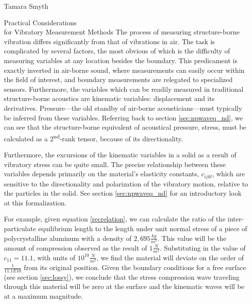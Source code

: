 \documentclass[a4paper,10pt]{report}
\numberwithin{equation}{section}
\begin{document}
\begin{chapter}{Tamara Smyth}
\begin{abstract}
 Imaging small vibrations have been of interest since Chladni first placed sand on a vibrating plate to make modal patterns visible. Discuss methods that have since been developed to remote sense and optically image sub-micrometer vibrations (e.g. laser Doppler vibrometry, holographic interferometry, electronic speckle pattern interferometry, etc.) including your own method currently being developed. Discuss the pros and cons of each method, and how your own method capitalizes on the strengths---or attempts to overcome any limitations---of its predecessors in the context of your particular application requirement(s).
\end{abstract}

\begin{section}{Practical Considerations\\ for Vibratory Measurement Methods}\label{sec:practical}
 The process of measuring structure-borne vibration differs significantly from that of vibrations in air. The task is complicated by several factors, the most obvious of which is the difficulty of measuring variables at any location besides the boundary. This predicament is exactly inverted in air-borne sound, where measurements can easily occur within the field of interest, and boundary measurements are relegated to specialized sensors. \cite[p.~3]{Cremer1973} Furthermore, the variables which can be readily measured in traditional structure-borne acoustics are kinematic variables: displacement and its derivatives. Pressure---the old standby of air-borne acousticians---must typically be inferred from these variables. Referring back to section \ref{sec:npwaveq_nd}, we can see that the structure-borne equivalent of acoustical pressure, stress, must be calculated as a 2\textsuperscript{nd}-rank tensor, because of its directionality. 

Furthermore, the excursions of the kinematic variables in a solid as a result of vibratory stress can be quite small. The precise relationship between these variables depends primarily on the material's elasticity constants, $c_{ijkl}$, which are sensitive to the directionality and polarization of the vibratory motion, relative to the particles in the solid. See section \ref{sec:npwaveq_nd} for an introductory look at this formalization. 

For example, given equation \eqref{recrelation}, we can calculate the ratio of the inter-particulate equilibrium length to the length under unit normal stress of a piece of polycrystalline aluminum with a density of $2,695 \frac{kg}{m^2}$. This value will be the amount of compression observed as the result of $1 \frac{N}{m^2}$. Substituting in the value of $c_{11} = 11.1$, with units of $10^{10} \frac{N}{m^2}$,\cite[p.~12]{Ballantine1997} we find the material will deviate on the order of $\frac{1}{11.1E10}$ from its original position. Given the boundary conditions for a free surface (see section \ref{sec:lossy}), we conclude that the stress compression wave traveling through this material will be zero at the surface and the kinematic waves will be at a maximum magnitude. 


\end{section}
\end{chapter}
\end{document}
